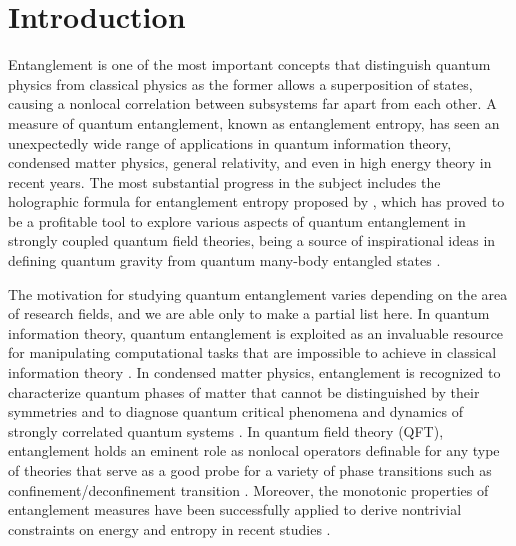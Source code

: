 \section{Introduction}
\label{ss:intro}


Entanglement is one of the most important concepts that distinguish quantum physics from classical physics as the former allows a superposition of states, causing a nonlocal correlation between subsystems far apart from each other.
A measure of quantum entanglement, known as entanglement entropy, has seen an unexpectedly wide range of applications in quantum information theory, condensed matter physics, general relativity, and even in high energy theory in recent years.
The most substantial progress in the subject includes the holographic formula for entanglement entropy proposed by \textcite{Ryu:2006bv,Ryu:2006ef}, which has proved to be a profitable tool to explore various aspects of quantum entanglement in strongly coupled quantum field theories, being a source of inspirational ideas in defining quantum gravity from quantum many-body entangled states \cite{Swingle:2009bg,VanRaamsdonk:2009ar,Maldacena:2013xja}.

The motivation for studying quantum entanglement varies depending on the area of research fields, and we are able only to make a partial list here.
In quantum information theory, quantum entanglement is exploited as an invaluable resource for manipulating computational tasks that are impossible to achieve in classical information theory \cite{nielsen2010quantum,Preskill:1997tq,Vedral:2002zz,ohya2004quantum,Eisert:2006ts,Horodecki:2009zz}.
In condensed matter physics, entanglement is recognized to characterize quantum phases of matter that cannot be distinguished by their symmetries \cite{Kitaev:2005dm,Levin:2006zz} and to diagnose quantum critical phenomena \cite{Vidal:2002rm,jin2004quantum,Calabrese:2004eu} and dynamics of strongly correlated quantum systems \cite{Calabrese:2005in,Calabrese:2007rg,eisler2007evolution}.
In quantum field theory (QFT), entanglement holds an eminent role as nonlocal operators definable for any type of theories that serve as a good probe for a variety of phase transitions such as confinement/deconfinement transition \cite{Nishioka:2006gr,Klebanov:2007ws,Pakman:2008ui}.
Moreover, the monotonic properties of entanglement measures have been successfully applied to derive nontrivial constraints on energy and entropy in recent studies \cite{Balakrishnan:2017bjg,Faulkner:2016mzt,Bousso:2015wca,Bousso:2014uxa,Bousso:2014sda}.


